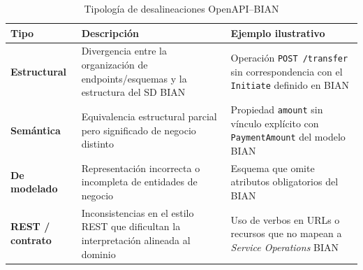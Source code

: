 \begin{table}[H]
  \centering
  \caption{Tipología de desalineaciones OpenAPI--BIAN}
  \label{tab:tipologias}
  \begin{tabular}{@{}p{}p{}p{}@{}}
    \toprule
    \textbf{Tipo} & \textbf{Descripción} & \textbf{Ejemplo ilustrativo} \\
    \midrule
    \textbf{Estructural} &
    Divergencia entre la organización de endpoints/esquemas y la estructura del SD BIAN &
    Operación \texttt{POST /transfer} sin correspondencia con el \Behavior{} \texttt{Initiate} definido en BIAN \\
    \textbf{Semántica} &
    Equivalencia estructural parcial pero significado de negocio distinto &
    Propiedad \texttt{amount} sin vínculo explícito con \texttt{PaymentAmount} del modelo BIAN \\
    \textbf{De modelado} &
    Representación incorrecta o incompleta de entidades de negocio &
    Esquema que omite atributos obligatorios del \BusinessObject{} BIAN \\
    \textbf{REST / contrato} &
    Inconsistencias en el estilo REST que dificultan la interpretación alineada al dominio &
    Uso de verbos en URLs o recursos que no mapean a \textit{Service Operations} BIAN \\
    \bottomrule
  \end{tabular}
\end{table}
